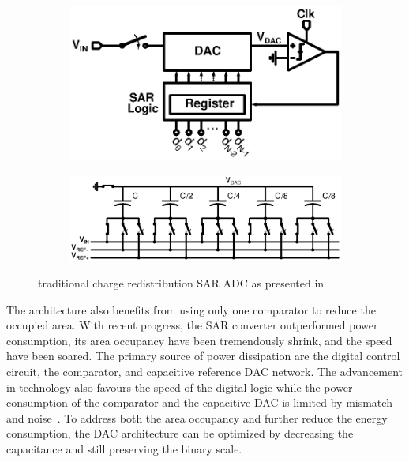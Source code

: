 \begin{figure}[htp]
	\centering
	\begin{subfigure}[b]{0.44\textwidth}
        \includegraphics[width=\textwidth]{Chapter3/Figs/sar_principle.ps}
        \label{fig:sar_principle}
    \end{subfigure}
    \begin{subfigure}[b]{0.52\textwidth}
        \includegraphics[width=\textwidth]{Chapter3/Figs/sar_classic_dac.ps}
        \label{fig:sar_dac_classical}
    \end{subfigure}
	\caption{traditional charge redistribution SAR ADC as presented in~\cite{McCreary1975}}
	\label{fig:sar_adc}
\end{figure}

The architecture also benefits from using only one comparator to reduce the occupied area. With recent progress, the SAR converter outperformed power consumption, its area occupancy have been tremendously shrink, and the speed have been soared. The primary source of power dissipation are the digital control circuit, the comparator, and capacitive reference DAC network. The advancement in technology also favours the speed of the digital logic while the power consumption of the comparator and the capacitive DAC is limited by mismatch and noise~\cite{Yue2013,Mueller2013,Collins2017}. To address both the area occupancy and further reduce the energy consumption, the DAC architecture can be optimized by decreasing the capacitance and still preserving the binary scale.

